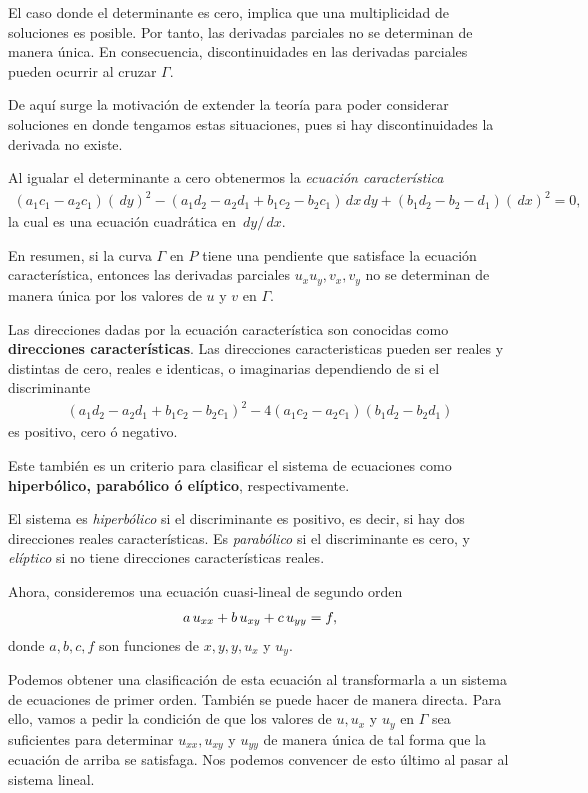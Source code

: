 El caso donde el determinante es cero, implica que una multiplicidad de soluciones es posible. Por tanto, las derivadas parciales no se determinan de manera única. En consecuencia, discontinuidades en las derivadas parciales pueden ocurrir al cruzar $\Gamma$.

De aquí surge la motivación de extender la teoría para poder considerar soluciones en donde tengamos estas situaciones, pues si hay discontinuidades la derivada no existe.

Al igualar el determinante a cero obtenermos la \textit{ecuación característica}
\begin{align*}
(a_1 c_1 - a_2 c_1)(\,dy)^2 - (a_1d_2 - a_2d_1 + b_1c_2 - b_2c_1) \,dx \,dy
+ (b_1d_2 - b_2-d_1) (\,dx)^2 = 0,
\end{align*}
la cual es una ecuación cuadrática en $\,dy/\,dx$. 

En resumen, si la curva $\Gamma$ en $P$ tiene una pendiente que satisface la ecuación característica, entonces las derivadas parciales $u_x u_y, v_x, v_y$ no se determinan de manera única por los valores de $u$ y $v$ en $\Gamma$. 

Las direcciones dadas por la ecuación característica son conocidas como \textbf{direcciones características}. Las direcciones caracteristicas pueden ser reales y distintas de cero, reales e identicas, o imaginarias dependiendo de si el discriminante
\begin{align*}
(a_1d_2 - a_2d_1 + b_1c_2 - b_2c_1)^2 - 4(a_1c_2 - a_2 c_1)(b_1d_2 - b_2 d_1)
\end{align*}
es positivo, cero ó negativo.

Este también es un criterio para clasificar el sistema de ecuaciones como \textbf{hiperbólico, parabólico ó elíptico}, respectivamente.

El sistema es \textit{hiperbólico} si el discriminante es positivo, es decir, si hay dos direcciones reales características. Es \textit{parabólico} si el discriminante es cero, y \textit{elíptico} si no tiene direcciones características reales.

Ahora, consideremos una ecuación cuasi-lineal de segundo orden
\begin{align*}
a \thinspace u_{xx} + b \thinspace u_{xy} + c \thinspace u_{yy} = f,
\end{align*}
donde $a,b,c,f$ son funciones de $x,y,y,u_x$ y $u_y$.

Podemos obtener una clasificación de esta ecuación al transformarla a un sistema de ecuaciones de primer orden. También se puede hacer de manera directa. Para ello, vamos a pedir la condición de que los valores de $u, u_x$ y $u_y$ en $\Gamma$ sea suficientes para determinar $u_{xx}, u_{xy}$ y $u_{yy}$ de manera única de tal forma que la ecuación de arriba se satisfaga. Nos podemos convencer de esto último al pasar al sistema lineal.


